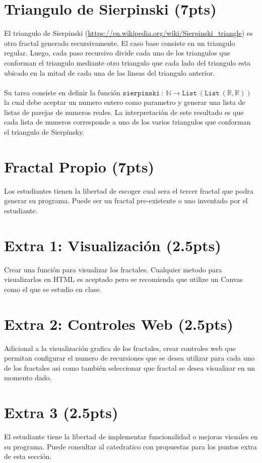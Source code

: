 \documentclass{article}
\begin{document}
\section*{Triangulo de Sierpinski (7pts)}
El triangulo de Sierpinski (\url{https://en.wikipedia.org/wiki/Sierpinski_triangle}) es otro fractal generado recursivamente.
El caso base consiste en un triangulo regular. Luego, cada paso recursivo divide cada uno de los triangulos que
conforman el triangulo mediante otro triangulo que cada lado del triangulo esta ubicado en
la mitad de cada una de las lineas del triangulo anterior.
\\\\
Su tarea consiste en definir la funci\'on $\mathtt{sierpinski}\ :\ \mathbb{N}\rightarrow \mathtt{List}\ 
(\mathtt{List}\ (\mathbb{R}, \mathbb{R}))$ la cual debe aceptar un numero entero como parametro y generar
una lista de listas de parejas de numeros reales. La interpretaci\'on de este resultado es que cada
lista de numeros corresponde a uno de los varios triangulos que conforman el triangulo de Sierpinsky.

\section*{Fractal Propio (7pts)}

Los estudiantes tienen la libertad de escoger cual sera el tercer fractal que podra generar su programa.
Puede ser un fractal pre-existente o uno inventado por el estudiante.

\section*{Extra 1: Visualizaci\'on (2.5pts)}

Crear una funci\'on para visualizar los fractales. Cualquier metodo para visualizarlos en HTML
es aceptado pero se recomienda que utilize un Canvas como el que se estudio en clase.

\section*{Extra 2: Controles Web (2.5pts)}

Adicional a la visualizaci\'on grafica de los fractales, crear controles web que permitan
configurar el numero de recursiones que se desea utilizar para cada uno de los fractales asi
como tambi\'en seleccionar que fractal se desea visualizar en un momento dado.

\section*{Extra 3 (2.5pts)}

El estudiante tiene la libertad de implementar funcionalidad o mejoras visuales en su
programa. Puede consultar al catedratico con propuestas para los puntos extra de esta
secci\'on.
\end{document}
